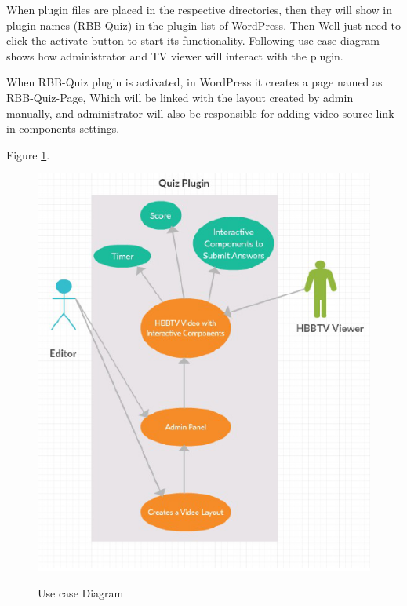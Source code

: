 When plugin files are placed in the respective directories,
then they will show in plugin names (RBB-Quiz) in the plugin
list of WordPress. Then Well just need to click the activate
button to start its functionality. Following use case diagram
shows how administrator and TV viewer will interact with the
plugin.


When RBB-Quiz plugin is activated, in WordPress it creates
a page named as RBB-Quiz-Page, Which will be linked with
the layout created by admin manually, and administrator will
also be responsible for adding video source link in components
settings.



 






 Figure \ref{fig:Use-case-Diagram}.

\begin{figure}[!ht]
	\centering
\includegraphics[scale=0.6]{figures/Use-case-Diagram.png}\\
	\caption{Use case Diagram }
	\label{fig:Use-case-Diagram}
\end{figure}
 
